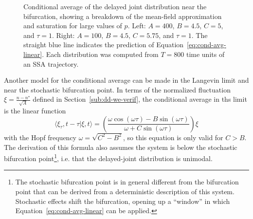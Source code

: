 \documentclass[english,letterpaper,12pt]{report}
\begin{document}
\begin{doublespacing}
\begin{figure}[tb]
{\begin{subfigure}{3in}
    \end{subfigure}
    }
    \caption{Conditional average of the delayed joint distribution near the bifurcation, showing a breakdown of the mean-field approximation and saturation for large values of $p$. Left: $A=400$, $B=4.5$, $C=5$, and $\tau=1$. Right: $A=100$, $B=4.5$, $C=5.75$, and $\tau=1$. The straight blue line indicates the prediction of Equation~\eqref{eq:cond-avg-linear}. Each distribution was computed from $T=800$ time units of an SSA trajectory.}
    \label{fig:ddjd-bif}
\end{figure}

Another model for the conditional average can be made in the Langevin limit and near the stochastic bifurcation point. In terms of the normalized fluctuation $\xi = \frac{n - n^\star}{\sqrt{A}}$ defined in Section~\ref{sub:dd-we-verif}, the conditional average in ths limit is the linear function \cite{delayed-deg-notes}
\begin{equation}
    \langle \xi_\tau, t - \tau | \xi, t \rangle = \left( \frac{\omega \cos(\omega \tau) - B \sin(\omega \tau)}{\omega + C \sin(\omega \tau)}\right)\xi 
    \label{eq:cond-avg-linear}
\end{equation}
with the Hopf frequency $\omega = \sqrt{C^2 - B^2}$, so this equation is only valid for $C > B$. The derivation of this formula also assumes the system is below the stochastic bifurcation point\footnote{The stochastic bifurcation point is in general different from the bifurcation point that can be derived from a deterministic description of this system. Stochastic effects shift the bifurcation, opening up a ``window'' in which Equation~\eqref{eq:cond-avg-linear} can be applied.}, i.e. that the delayed-joint distribution is unimodal.


\end{doublespacing}
\end{document}
